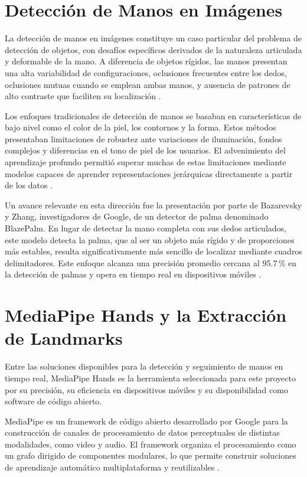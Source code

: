 \section{Detección de Manos en Imágenes}

La detección de manos en imágenes constituye un caso particular del problema de detección
de objetos, con desafíos específicos derivados de la naturaleza articulada y deformable de
la mano. A diferencia de objetos rígidos, las manos presentan una alta variabilidad de
configuraciones, oclusiones frecuentes entre los dedos, oclusiones mutuas cuando se
emplean ambas manos, y ausencia de patrones de alto contraste que faciliten su
localización \cite{bazarevsky_blazepalm_2019}.

Los enfoques tradicionales de detección de manos se basaban en características de bajo nivel
como el color de la piel, los contornos y la forma. Estos métodos presentaban limitaciones
de robustez ante variaciones de iluminación, fondos complejos y diferencias en el tono de
piel de los usuarios. El advenimiento del aprendizaje profundo permitió superar muchas de
estas limitaciones mediante modelos capaces de aprender representaciones jerárquicas
directamente a partir de los datos \cite{szeliski_cv_2022}.

Un avance relevante en esta dirección fue la presentación por parte de Bazarevsky y Zhang,
investigadores de Google, de un detector de palma denominado BlazePalm. En lugar de
detectar la mano completa con sus dedos articulados, este modelo detecta la palma, que al
ser un objeto más rígido y de proporciones más estables, resulta significativamente más
sencillo de localizar mediante cuadros delimitadores. Este enfoque alcanza una precisión
promedio cercana al 95.7\,\% en la detección de palmas y opera en tiempo real en
dispositivos móviles \cite{bazarevsky_blazepalm_2019}.

\section{MediaPipe Hands y la Extracción de Landmarks}

Entre las soluciones disponibles para la detección y seguimiento de manos en tiempo real,
MediaPipe Hands es la herramienta seleccionada para este proyecto por su precisión,
su eficiencia en dispositivos móviles y su disponibilidad como software de código abierto.

MediaPipe es un framework de código abierto desarrollado por Google para la construcción
de canales de procesamiento de datos perceptuales de distintas modalidades, como video y
audio. El framework organiza el procesamiento como un grafo dirigido de componentes
modulares, lo que permite construir soluciones de aprendizaje automático multiplataforma
y reutilizables \cite{lugaresi_mediapipe_2019}.

